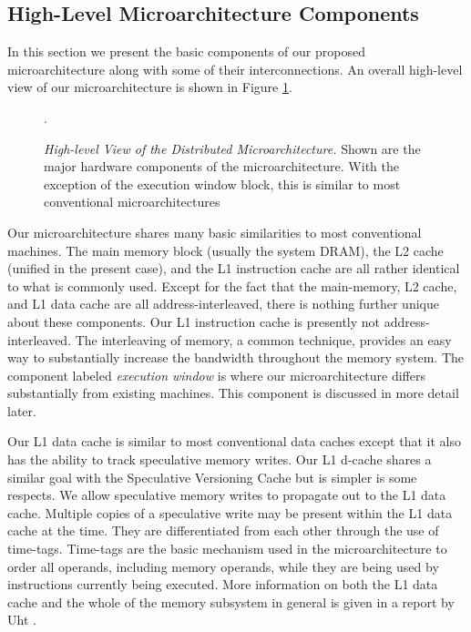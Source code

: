 \documentclass[10pt,dvips]{article}
\begin{document}
\subsection{High-Level Microarchitecture Components}
%
In this section we present the basic components of our proposed
microarchitecture along with some of their interconnections.
An overall high-level view of our microarchitecture is shown in 
Figure \ref{fig:high}.
%
\begin{figure}
\centering
{}
\caption{{\em High-level View of the Distributed Microarchitecture.} 
Shown are the major hardware components of the microarchitecture.
With the exception of the 
execution window block, this is similar to most conventional
microarchitectures}.
\label{fig:high}
\end{figure}
%
Our microarchitecture shares many basic similarities to most conventional
machines.
The main memory block (usually the system DRAM),
the L2 cache (unified in the present case), and the L1 instruction 
cache are all rather identical to what is commonly used.
Except for the fact that the main-memory, L2 cache, and L1 data
cache are all address-interleaved, there is nothing further
unique about these components.  Our L1 instruction
cache is presently not address-interleaved.
The interleaving of memory, a common technique, provides an easy way
to substantially increase the bandwidth throughout the
memory system.  
The component labeled \textit{execution window} is where
our microarchitecture differs substantially from existing machines.
This component is discussed in more detail later.

Our L1 data cache is similar to
most conventional data caches except that it also has the ability to
track speculative memory writes.
Our L1 d-cache shares a similar goal with the 
Speculative Versioning Cache \cite{Gop98} 
but is simpler is some respects.
We allow speculative memory writes to propagate
out to the L1 data cache.  Multiple copies
of a speculative write may be present within the L1 data cache
at the time.  They are differentiated from each other
through the use of time-tags.  Time-tags are the basic mechanism
used in the microarchitecture to order all operands, including
memory operands, while they are being used by instructions
currently being executed.
More information on both the L1 data cache and the whole of
the memory subsystem in general is given in a report
by Uht \cite{Uht02b}.
\end{document}
